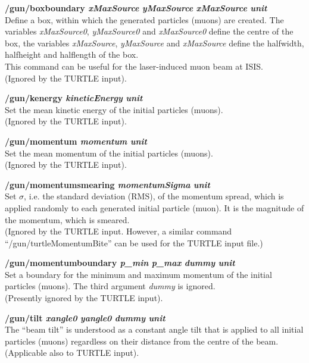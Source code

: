 \documentclass[twoside]{dis04}
\begin{document}
\begin{description}
\item{\bf /gun/boxboundary \emph{xMaxSource} \emph{yMaxSource} \emph{xMaxSource}  \emph{unit}} \\
        Define a box, within which the generated particles (muons) are created.
	The variables \emph{xMaxSource0}, \emph{yMaxSource0} and \emph{xMaxSource0} define the
	centre of the box, the variables \emph{xMaxSource}, \emph{yMaxSource} and \emph{xMaxSource} define the
	halfwidth, halfheight and halflength of the box. \\
	This command can be useful for the laser-induced muon beam at ISIS.\\
	(Ignored by the TURTLE input).

\item{\bf /gun/kenergy \emph{kineticEnergy} \emph{unit}}\\
	Set the mean kinetic energy of the initial particles (muons).\\
	(Ignored by the TURTLE input).	

\item{\bf /gun/momentum \emph{momentum} \emph{unit}}\\
	Set the mean momentum of the initial particles (muons).\\
	(Ignored by the TURTLE input).	

\item{\bf /gun/momentumsmearing  \emph{momentumSigma} \emph{unit}}\\
	Set $\sigma$, i.e. the standard deviation (RMS), of the momentum spread, which
        is applied randomly to each generated initial particle (muon). It is the magnitude
	of the momentum, which is smeared. \\
	(Ignored by the TURTLE input.  However,
	a similar command ``/gun/turtleMomentumBite'' can be used for the TURTLE input file.)

\item{\bf /gun/momentumboundary \emph{p\_min} \emph{p\_max} \emph{dummy} \emph{unit}}\\
	Set a boundary for the minimum and maximum momentum of the initial particles (muons).
	The third argument \emph{dummy} is ignored.\\
	(Presently ignored by the TURTLE input).

\item{\bf /gun/tilt \emph{xangle0} \emph{yangle0} \emph{dummy} \emph{unit}}\\
	The ``beam tilt'' is understood as a constant angle tilt that is applied to
	all initial particles (muons) regardless on their distance from the centre of the beam.\\
	(Applicable also to TURTLE input).


\end{description}
\end{document}
